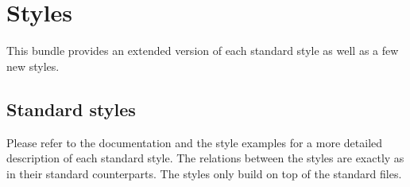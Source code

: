 \documentclass[DIV=9]{scrartcl}
\begin{document}
\clearpage
\section{Styles}\label{sec:styles}
This bundle provides an extended version of each standard style as well as a
few new styles.
\subsection{Standard styles}\label{sec:styles:standard}
Please refer to the  documentation%
and the style examples%
for a more detailed description of each standard style.
The relations between the styles are exactly as in their standard counterparts.
The  styles only build on top of the standard files.
\end{document}
